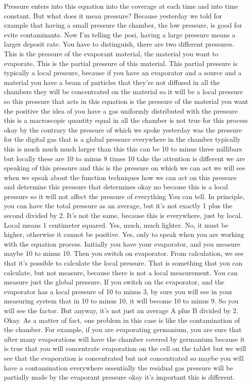 Pressure enters into this equation into the coverage at each time and into time constant. But what does it mean pressure? Because yesterday we told for example that having a small pressure the chamber, the low pressure, is good for evite contaminants. Now I'm telling the posi, having a large pressure means a larger deposit rate. You have to distinguish, there are two different pressures. This is the pressure of the evaporant material, the material you want to evaporate. This is the partial pressure of this material. This partial pressure is typically a local pressure, because if you have an evaporator and a source and a material you have a beam of particles that they're not diffused in all the chambers they will be concentrated on the material so it will be a local pressure so this pressure that acts in this equation is the pressure of the material you want the positive the idea of you have a gas uniformly distributed with the pressure this is a macroscopic quantity equal in all the chamber is not true for this process okay by the contrary the pressure of which we spoke yesterday was the pressure for the digital gas that is a global pressure everywhere in the chamber typically this is much much much larger than this this can be 10 to minus three millibars but locally these are 10 to minus 8 times 10 take the attention is different we are speaking of this pressure and this is the pressure on which we can act we will see when we speak about the function techniques how we can act on this pressure and determine this pressure that determines okay no because this is a local pressure so it will not affect the pressure of everything You can tell. In principle, you can have the total pressure as an average, but it's not exactly 1 plus the second divided by 2. It's not the same, because this is everywhere, just by local. Local means 1 centimeter squared. Yes, much, much lighter. No, it must be higher, otherwise it cannot be positive. Yes, only to speak when you are working with the equation process. Initially you have your evaporator, and you measure maybe 10 to minus 10. Then you switch on evaporator. From calculation, we see that it's possible to calculate the local pressure. That is something that you can calculate, but not measure, because there is not a local measurement. You can measure just the global pressure. If you switch on the evaporator, and the evaporator has a local pressure of 10 to minus 3, by sure you will see in your measuring system that in 10 to minus 10, it will become 10 to minus 9. So you will see the factor. But anyway, it's not just an average A plus B divided by 2. Okay. As a matter of fact, one problem in this case is like the contamination of the chamber. For example, if you are evaporating germanium, you are sure that after many evaporations will have the chamber covered by germanium because it is true that you will concentrate evaporation on the cell on the tablet but we will see that the evaporation is concentrated but not concentrated so maybe you will have a contamination everywhere essentially the residual gas pressure will be partially made by the evaporant pressure okay it's important this is different.
